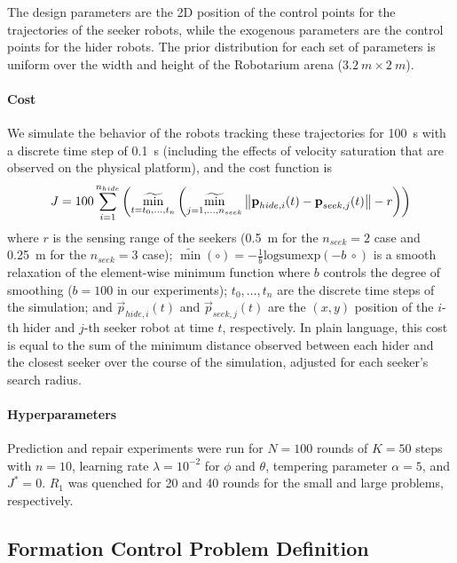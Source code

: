 The design parameters are the 2D position of the control points for the trajectories of the seeker robots, while the exogenous parameters are the control points for the hider robots. The prior distribution for each set of parameters is uniform over the width and height of the Robotarium arena ($\SI{3.2}{m}\times\SI{2}{m}$).

\paragraph{Cost} We simulate the behavior of the robots tracking these trajectories for \SI{100}{s} with a discrete time step of \SI{0.1}{s} (including the effects of velocity saturation that are observed on the physical platform), and the cost function is
\begin{align*}
    J = 100 \sum_{i=1}^{n_{hide}}\left( \mathop{\widetilde{\min}}_{t = t_0, \ldots, t_{n}} \left( \mathop{\widetilde{\min}}_{j=1, \ldots, n_{seek}}\left\lVert\boldsymbol{\mathbf{p}}_{hide, i}(t) - \boldsymbol{\mathbf{p}}_{seek, j}(t)\right\rVert - r \right) \right)
\end{align*}
%
where $r$ is the sensing range of the seekers (\SI{0.5}{m} for the $n_{seek} = 2$ case and \SI{0.25}{m} for the $n_{seek}=3$ case); $\widetilde{\min}(\circ) = -\frac{1}{b}\text{logsumexp}(-b\ \circ)$ is a smooth relaxation of the element-wise minimum function where $b$ controls the degree of smoothing ($b=100$ in our experiments); $t_0, \ldots, t_{n}$ are the discrete time steps of the simulation; and $\vec{p}_{hide, i}(t)$ and $\vec{p}_{seek, j}(t)$ are the $(x, y)$ position of the $i$-th hider and $j$-th seeker robot at time $t$, respectively. In plain language, this cost is equal to the sum of the minimum distance observed between each hider and the closest seeker over the course of the simulation, adjusted for each seeker's search radius.

\paragraph{Hyperparameters} Prediction and repair experiments were run for $N=100$ rounds of $K=50$ steps with $n=10$, learning rate $\lambda = 10^{-2}$ for $\phi$ and $\theta$, tempering parameter $\alpha = 5$, and $J^* = 0$.  $R_1$ was quenched for 20 and 40 rounds for the small and large problems, respectively.

\subsection{Formation Control Problem Definition}

